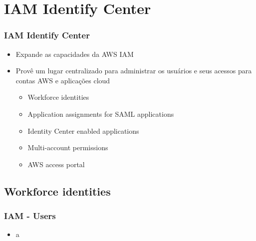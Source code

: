 \section{IAM Identify Center}

\begin{frame}
	\frametitle{IAM Identify Center}
	\begin{itemize}
		\item Expande as capacidades da AWS IAM
		\item Provê um lugar centralizado para administrar os usuários e seus acessos para contas AWS e aplicações cloud
			\begin{itemize}
				\item Workforce identities
				\item Application assignments for SAML applications
				\item Identity Center enabled applications
				\item Multi-account permissions
				\item AWS access portal
			\end{itemize}
	\end{itemize}
\end{frame}

\subsection{Workforce identities}

\begin{frame}
	\frametitle{IAM - Users}
	\begin{itemize}
		\item a
	\end{itemize}
\end{frame}

